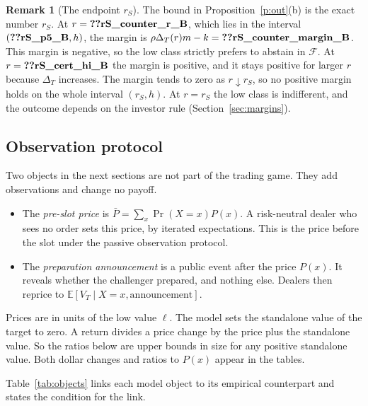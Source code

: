 \documentclass[12pt]{article}
\theoremstyle{definition}
\newtheorem{remark}{Remark}
\newcommand{\E}{\mathbb E}
\begin{document}
\begin{remark}[The endpoint $r_S$]\label{r:rS}
The bound in Proposition~\ref{p:out}(b) is the exact number $r_S$.
At $r=\reg{rS_counter_r_B}$, which lies in the interval $(\reg{rS_p5_B},h)$, the margin is $\rho\Delta_T(r)m-k=\reg{rS_counter_margin_B}$.
This margin is negative, so the low class strictly prefers to abstain in $\mathcal F$.
At $r=\reg{rS_cert_hi_B}$ the margin is positive, and it stays positive for larger $r$ because $\Delta_T$ increases.
The margin tends to zero as $r\downarrow r_S$, so no positive margin holds on the whole interval $(r_S,h)$.
At $r=r_S$ the low class is indifferent, and the outcome depends on the investor rule (Section~\ref{sec:margins}).
\end{remark}

\subsection{Observation protocol}\label{sec:protocol}

Two objects in the next sections are not part of the trading game.
They add observations and change no payoff.
\begin{itemize}
\item The \emph{pre-slot price} is $\bar P=\sum_x\Pr(X=x)P(x)$.
A risk-neutral dealer who sees no order sets this price, by iterated expectations.
This is the price before the slot under the passive observation protocol.
\item The \emph{preparation announcement} is a public event after the price $P(x)$.
It reveals whether the challenger prepared, and nothing else.
Dealers then reprice to $\E[V_T\mid X=x,\text{announcement}]$.
\end{itemize}
Prices are in units of the low value $\ell$.
The model sets the standalone value of the target to zero.
A return divides a price change by the price plus the standalone value.
So the ratios below are upper bounds in size for any positive standalone value.
Both dollar changes and ratios to $P(x)$ appear in the tables.

Table~\ref{tab:objects} links each model object to its empirical counterpart and states the condition for the link.
\end{document}

